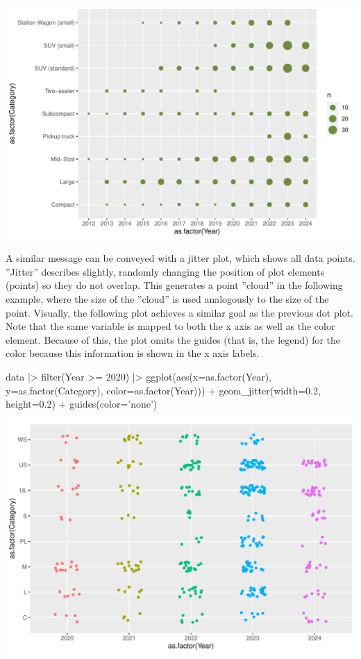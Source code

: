 \begin{center}
  \includegraphics[width=.8\textwidth]{fuel.count.pdf}
\end{center}

A similar message can be conveyed with a jitter plot, which shows all data points. ''Jitter'' describes slightly, randomly changing the position of plot elements (points) so they do not overlap. This generates a point ''cloud'' in the following example, where the size of the ''cloud'' is used analogously to the size of the point. Visually, the following plot achieves a similar goal as the previous dot plot. Note that the same variable is mapped to both the x axis as well as the color element. Because of this, the plot omits the guides (that is, the legend) for the color because this information is shown in the x axis labels.

\begin{samepage}
\begin{Rcode}
data |> 
  filter(Year >= 2020) |>
  ggplot(aes(x=as.factor(Year), y=as.factor(Category), 
             color=as.factor(Year))) +
    geom_jitter(width=0.2, height=0.2) +
    guides(color='none')
\end{Rcode}
\end{samepage}

\begin{center}
  \includegraphics[width=.8\textwidth]{fuel.jitterdiscrete.pdf}
\end{center}

